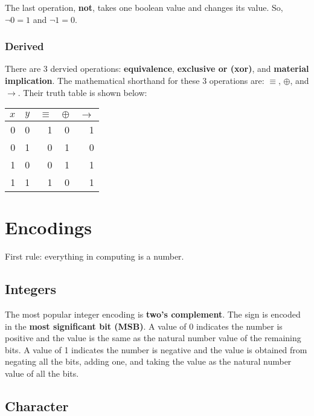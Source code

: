 \documentclass[12pt]{book}
\begin{document}
  The last operation, \textbf{not}, takes one boolean value and changes its
  value. So, $\lnot 0 = 1$ and $\lnot 1 = 0$.

  \subsection{Derived}

  There are 3 dervied operations: \textbf{equivalence}, \textbf{exclusive or
  (xor)}, and \textbf{material implication}. The mathematical shorthand for
  these 3 operations are: $\equiv$, $\oplus$, and $\to$. Their truth table is
  shown below:

  \begin{center}
    \begin{tabular}{r r | r | r | r}
      $x$ & $y$ & $\equiv$ & $\oplus$ & $\to$ \\
      \hline
        0 &   0 &        1 &        0 &     1 \\
        0 &   1 &        0 &        1 &     0 \\
        1 &   0 &        0 &        1 &     1 \\
        1 &   1 &        1 &        0 &     1 \\
    \end{tabular}
  \end{center}

  \chapter{Encodings}

  First rule: everything in computing is a number.

  \section{Integers}

  The most popular integer encoding is \textbf{two's complement}. The sign is
  encoded in the \textbf{most significant bit (MSB)}. A value of 0 indicates the
  number is positive and the value is the same as the natural number value of
  the remaining bits. A value of 1 indicates the number is negative and the
  value is obtained from negating all the bits, adding one, and taking the value
  as the natural number value of all the bits.

  \newpage
  \section{Character}
\end{document}

